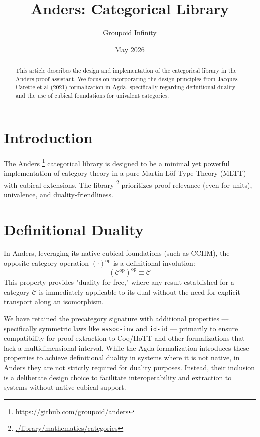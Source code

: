 \documentclass[11pt]{article}
\title{Anders: Categorical Library}
\author{Groupoid Infinity}
\date{May 2026}
\newcommand{\catC}{\mathcal{C}}
\newcommand{\op}{^\text{op}}
\begin{document}
\maketitle

\begin{abstract}
This article describes the design and implementation of the categorical library in the Anders proof assistant.
We focus on incorporating the design principles from Jacques Carette et al (2021) formalization in Agda,
specifically regarding definitional duality and the use of cubical foundations for univalent categories.
\end{abstract}

\tableofcontents

\section{Introduction}

The Anders \footnote{\url{https://github.com/groupoid/anders}} categorical library is designed to be a minimal yet powerful
implementation of category theory in a pure Martin-Löf Type Theory (MLTT)
with cubical extensions. The library \footnote{\url{./library/mathematics/categories}}
prioritizes proof-relevance (even for units), univalence, and duality-friendliness.

\section{Definitional Duality}

In Anders, leveraging its native cubical foundations (such as CCHM), the opposite category operation $(\cdot)\op$ is a definitional involution:
\begin{equation}
    (\catC\op)\op \equiv \catC
\end{equation}
This property provides "duality for free," where any result established for a category $\catC$ is immediately applicable to its dual without the need for explicit transport along an isomorphism.

We have retained the precategory signature with additional properties ---
specifically symmetric laws like \texttt{assoc-inv} and \texttt{id-id} ---
primarily to ensure compatibility for proof extraction to Coq/HoTT and other
formalizations that lack a multidimensional interval. While the Agda
formalization \cite{carette2021} introduces these properties to achieve
definitional duality in systems where it is not native, in Anders they
are not strictly required for duality purposes. Instead, their inclusion
is a deliberate design choice to facilitate interoperability and extraction
to systems without native cubical support.
\end{document}
